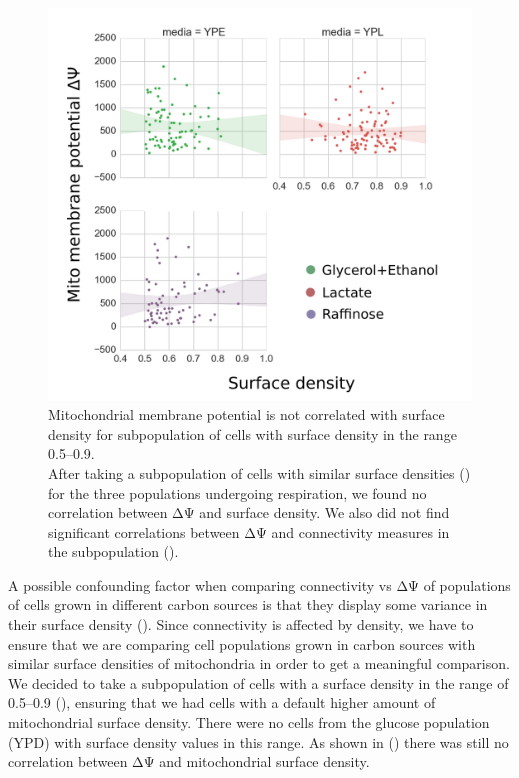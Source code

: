 \begin{figure}[htp]
	\centering
    \includegraphics[width=.55\textwidth]{subset}
    \caption[Cells with similar surface density do not show correlation of with surface density]{Mitochondrial membrane potential is not correlated with surface density for subpopulation of cells with surface density in the range 0.5--0.9.\\After taking a subpopulation of cells with similar surface densities () for the three populations undergoing respiration, we found no correlation between ΔΨ and surface density. We also did not find significant correlations between ΔΨ and connectivity measures in the subpopulation ().}\label{fig:subset}
\end{figure}
%
A possible confounding factor when comparing connectivity vs ΔΨ of populations of cells grown in different carbon sources is that they display some variance in their surface density (). Since connectivity is affected by density, we have to ensure that we are comparing cell populations grown in carbon sources with similar surface densities of mitochondria in order to get a meaningful comparison. We decided to take a subpopulation of cells with a surface density in the range of 0.5--0.9 (), ensuring that we had cells with a default higher amount of mitochondrial surface density. There were no cells from the glucose population (YPD) with surface density values in this range. As shown in () there was still no correlation between ΔΨ and mitochondrial surface density.
